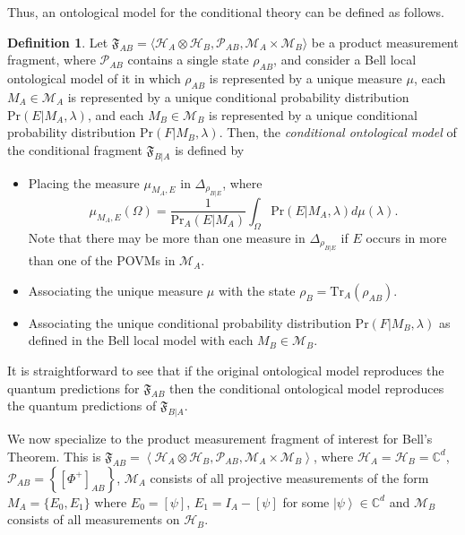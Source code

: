 \documentclass[DIV=calc,paper=a4,fontsize=11pt,twocolumn]{scrartcl} %
\theoremstyle{definition}
\newtheorem{definition}{Definition}[section]
\theoremstyle{plain}
\newcommand{\Ket}[1]{\ensuremath{\left \vert #1 \right \rangle}}
\newcommand{\Proj}[1]{\ensuremath{\left [ #1 \right ]}}
\newcommand{\Hilb}[1][]{\ensuremath{\mathcal{H}_{#1}}}
\newcommand{\Tr}[2][]{\ensuremath{\text{Tr}_{#1} \left ( #2 \right )}}
\begin{document}
Thus, an ontological model for the conditional theory can be defined
as follows.
\begin{definition}
\label{def:Bell:cond}
Let $\mathfrak{F}_{AB} = \langle \Hilb[A] \otimes \Hilb[B],
\mathcal{P}_{AB}, \mathcal{M}_A \times \mathcal{M}_B \rangle$ be a
product measurement fragment, where $\mathcal{P}_{AB}$ contains a
single state $\rho_{AB}$, and consider a Bell local ontological
model of it in which $\rho_{AB}$ is represented by a unique measure
$\mu$, each $M_A \in \mathcal{M}_A$ is represented by a unique
conditional probability distribution $\text{Pr}(E|M_A,\lambda)$, and
each $M_B \in \mathcal{M}_B$ is represented by a unique conditional
probability distribution $\text{Pr}(F|M_B,\lambda)$.  Then, the
\emph{conditional ontological model} of the conditional fragment
$\mathfrak{F}_{B|A}$ is defined by
\begin{itemize}
\item Placing the measure $\mu_{M_A,E}$ in $\Delta_{\rho_{B|E}}$,
where
\begin{equation}
\mu_{M_A,E}(\Omega) = \frac{1}{\text{Pr}_A(E|M_A)}\int_{\Omega}
\text{Pr}(E|M_A,\lambda) d\mu(\lambda).
\end{equation}
Note that there may be more than one measure in
$\Delta_{\rho_{B|E}}$ if $E$ occurs in more than one of the POVMs
in $\mathcal{M}_A$.
\item Associating the unique measure $\mu$ with the state $\rho_B =
\Tr[A]{\rho_{AB}}$.
\item Associating the unique conditional probability distribution
$\text{Pr}(F|M_B,\lambda)$ as defined in the Bell local model
with each $M_B \in \mathcal{M}_B$.
\end{itemize}
\end{definition}
It is straightforward to see that if the original ontological model
reproduces the quantum predictions for $\mathfrak{F}_{AB}$ then the
conditional ontological model reproduces the quantum predictions of
$\mathfrak{F}_{B|A}$.

We now specialize to the product measurement fragment of interest for
Bell's Theorem.  This is $\mathfrak{F}_{AB} = \left \langle \Hilb[A]
\otimes \Hilb[B], \mathcal{P}_{AB}, \mathcal{M}_A \times
\mathcal{M}_B \right \rangle$, where $\Hilb[A] = \Hilb[B] =
\mathbb{C}^d$, $\mathcal{P}_{AB} = \left \{ \Proj{\Phi^+}_{AB} \right
\}$, $\mathcal{M}_A$ consists of all projective measurements of the
form $M_A = \{E_0,E_1\}$ where $E_0 = \Proj{\psi}$, $E_1 = I_A -
\Proj{\psi}$ for some $\Ket{\psi} \in \mathbb{C}^d$ and
$\mathcal{M}_B$ consists of all measurements on $\Hilb[B]$.
\end{document}
